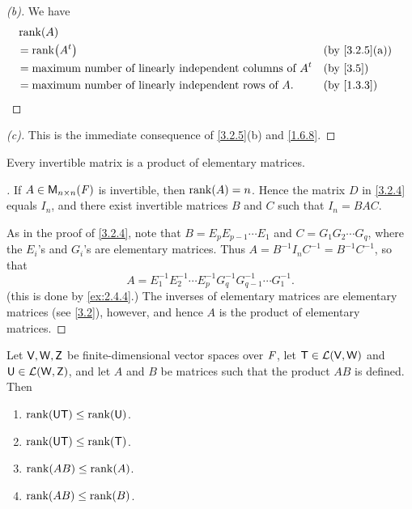 \begin{proof}[(b)]
  We have
  \begin{align*}
     & \rk{A}                                                                                \\
     & = \rk{\tp{A}}                                                      &  & \by{3.2.5}[a] \\
     & = \text{maximum number of linearly independent columns of } \tp{A} &  & \by{3.5}      \\
     & = \text{maximum number of linearly independent rows of } A.        &  & \by{1.3.3}
  \end{align*}
\end{proof}

\begin{proof}[(c)]
  This is the immediate consequence of \cref{3.2.5}(b) and \cref{1.6.8}.
\end{proof}

\begin{cor}\label{3.2.6}
  Every invertible matrix is a product of elementary matrices.
\end{cor}

\begin{proof}[]
  If \(A \in \ms[n][n][\F]\) is invertible, then \(\rk{A} = n\).
  Hence the matrix \(D\) in \cref{3.2.4} equals \(I_n\), and there exist invertible matrices \(B\) and \(C\) such that \(I_n = BAC\).

  As in the proof of \cref{3.2.4}, note that \(B = E_p E_{p - 1} \cdots E_1\) and \(C = G_1 G_2 \cdots G_q\), where the \(E_i\)'s and \(G_i\)'s are elementary matrices.
  Thus \(A = B^{-1} I_n C^{-1} = B^{-1} C^{-1}\), so that
  \[
    A = E_1^{-1} E_2^{-1} \cdots E_p^{-1} G_q^{-1} G_{q - 1}^{-1} \cdots G_1^{-1}.
  \]
  (this is done by \cref{ex:2.4.4}.)
  The inverses of elementary matrices are elementary matrices (see \cref{3.2}), however, and hence \(A\) is the product of elementary matrices.
\end{proof}

\begin{thm}\label{3.7}
  Let \(\mathsf{V}, \mathsf{W}, \mathsf{Z}\) be finite-dimensional vector spaces over \(\mathit{F}\), let \(\mathsf{T} \in \mathcal{L}(\mathsf{V}, \mathsf{W})\) and \(\mathsf{U} \in \mathcal{L}(\mathsf{W}, \mathsf{Z})\), and let \(A\) and \(B\) be matrices such that the product \(AB\) is defined.
  Then
  \begin{enumerate}
    \item \(\rk{\U \T} \leq \rk{\U}\).
    \item \(\rk{\U \T} \leq \rk{\T}\).
    \item \(\rk{AB} \leq \rk{A}\).
    \item \(\rk{AB} \leq \rk{B}\).
  \end{enumerate}
\end{thm}

